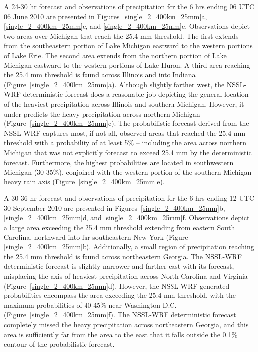 A 24-30 hr forecast and observations of precipitation for the 6 hrs ending 06 UTC 06 June 2010 are presented in \mbox{Figures \ref{single_2_400km_25mm}a}, \mbox{\ref{single_2_400km_25mm}c}, and \mbox{\ref{single_2_400km_25mm}e}.
Observations depict two areas over Michigan that reach the 25.4 mm threshold.
The first extends from the southeastern portion of Lake Michigan eastward to the western portions of Lake Erie.
The second area extends from the northern portion of Lake Michigan eastward to the western portions of Lake Huron.
A third area reaching the 25.4 mm threshold is found across Illinois and into Indiana \mbox{(Figure \ref{single_2_400km_25mm}a)}.
Although slightly farther west, the NSSL-WRF deterministic forecast does a reasonable job depicting the general location of the heaviest precipitation across Illinois and southern Michigan.
However, it under-predicts the heavy precipitation across northern Michigan \mbox{(Figure \ref{single_2_400km_25mm}c)}.
The probabilistic forecast derived from the NSSL-WRF captures most, if not all, observed areas that reached the 25.4 mm threshold with a probability of at least 5\% -- including the area across northern Michigan that was not explicitly forecast to exceed 25.4 mm by the deterministic forecast.
Furthermore, the highest probabilities are located in southwestern Michigan (30-35\%), conjoined with the western portion of the southern Michigan heavy rain axis \mbox{(Figure \ref{single_2_400km_25mm}e)}.


A 30-36 hr forecast and observations of precipitation for the 6 hrs ending 12 UTC 30 September 2010 are presented in \mbox{Figures \ref{single_2_400km_25mm}b}, \mbox{\ref{single_2_400km_25mm}d}, and \mbox{\ref{single_2_400km_25mm}f}.
Observations depict a large area exceeding the 25.4 mm threshold extending from eastern South Carolina, northward into far southeastern New York (Figure \mbox{\ref{single_2_400km_25mm}b)}.
Additionally, a small region of precipitation reaching the 25.4 mm threshold is found across northeastern Georgia.
The NSSL-WRF deterministic forecast is slightly narrower and farther east with its forecast, misplacing the axis of heaviest precipitation across North Carolina and Virginia \mbox{(Figure \ref{single_2_400km_25mm}d)}.
However, the NSSL-WRF generated probabilities encompass the area exceeding the 25.4 mm threshold, with the maximum probabilities of 40-45\% near Washington D.C. \mbox{(Figure \ref{single_2_400km_25mm}f)}.
The NSSL-WRF deterministic forecast completely missed the heavy precipitation across northeastern Georgia, and this area is sufficiently far from the area to the east that it falls outside the 0.1\% contour of the probabilistic forecast.


